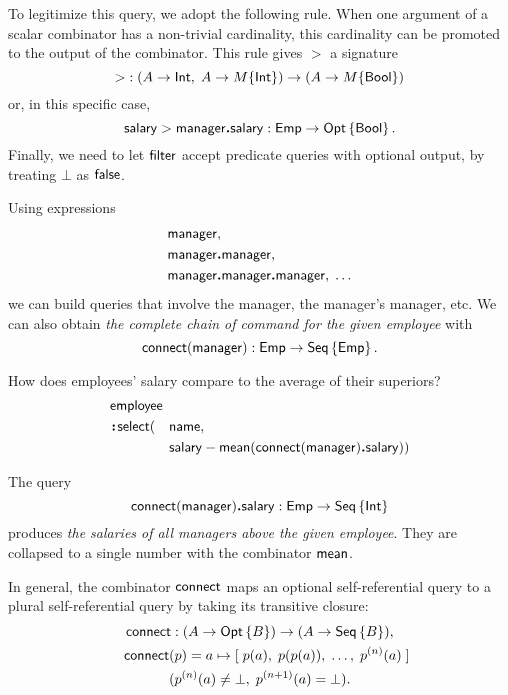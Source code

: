 To legitimize this query, we adopt the following rule.  When one argument of a
scalar combinator has a non-trivial cardinality, this cardinality can be
promoted to the output of the combinator.  This rule gives ${>}$ a signature
\begin{equation*}
    {>} : (A \to \textup{\textsf{Int}},\; A \to M\{\textup{\textsf{Int}}\}) \to (A \to M\{\textup{\textsf{Bool}}\})
\end{equation*}
or, in this specific case,
\begin{equation*}
    \textup{\textsf{salary}} > \textup{\textsf{manager}}\boldsymbol{.}\textup{\textsf{salary}} : \textup{\textsf{Emp}} \to \textup{\textsf{Opt}}\left\{\textup{\textsf{Bool}}\right\}.
\end{equation*}
Finally, we need to let $\textup{\textsf{filter}}$ accept predicate queries with optional
output, by treating $\bot$ as $\textup{\textsf{false}}$.

Using expressions
\begin{align*}
    & \textup{\textsf{manager}}, \\
    & \textup{\textsf{manager}}\boldsymbol{.}\textup{\textsf{manager}}, \\
    & \textup{\textsf{manager}}\boldsymbol{.}\textup{\textsf{manager}}\boldsymbol{.}\textup{\textsf{manager}},\; \ldots
\end{align*}
we can build queries that involve the manager, the manager's manager, etc.  We
can also obtain \emph{the complete chain of command for the given employee}
with
\begin{equation*}
    \textup{\textsf{connect}}(\textup{\textsf{manager}}) : \textup{\textsf{Emp}} \to \textup{\textsf{Seq}}\left\{\textup{\textsf{Emp}}\right\}.
\end{equation*}

\begin{example}
    \label{ex:employee-salary-vs-superior}
    How does employees' salary compare to the average of their superiors?
    \begin{alignat*}{2}
        & \Employee\hidewidth && \\
        & \Apply\Select(&& \Name, \\
        & && \Salary-\Mean(\Connect(\Manager)\To\Salary))
    \end{alignat*}
\end{example}

The query
\begin{equation*}
    \textup{\textsf{connect}}(\textup{\textsf{manager}})\boldsymbol{.}\textup{\textsf{salary}} : \textup{\textsf{Emp}} \to \textup{\textsf{Seq}}\left\{\textup{\textsf{Int}}\right\}
\end{equation*}
produces \emph{the salaries of all managers above the given employee}.  They
are collapsed to a single number with the combinator $\textup{\textsf{mean}}$.

In general, the combinator $\textup{\textsf{connect}}$ maps an optional self-referential query to a
plural self-referential query by taking its transitive closure:
\begin{multline*}
    \Connect : (A \to \Opt{B}) \to (A \to \Seq{B}), \\
    \shoveleft{\Connect(p) = a \mapsto [\;p(a),\; p(p(a)),\; \ldots,\; p^{(n)}(a)\;]} \\
    (p^{(n)}(a) \ne \bot,\; p^{(n+1)}(a) = \bot).
\end{multline*}



